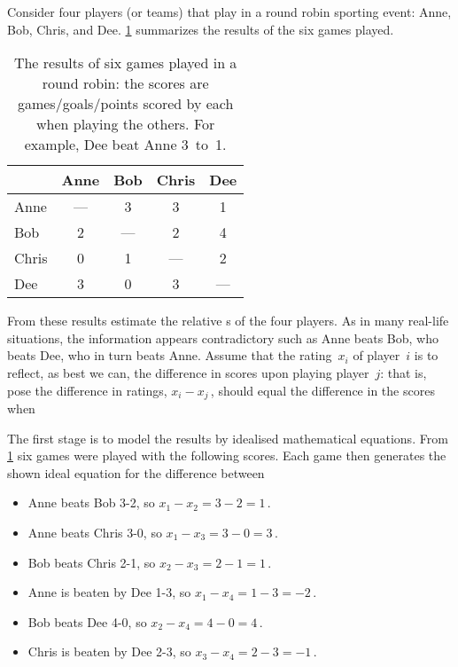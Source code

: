 \begin{example} \label{eg:roundrobin1}
Consider four players (or teams) that play in a round robin sporting event: Anne, Bob, Chris, and Dee.
\cref{tbl:roundrobin1} summarizes the results of the six games played.
\begin{table}
\caption{The results of six games played in a round robin: the scores are games\slash goals\slash points scored by each when playing the others.  For example, Dee beat Anne 3~to~1.}
\label{tbl:roundrobin1}
\begin{center}
\begin{tabular}{l|cccc} \hline
&Anne& Bob& Chris& Dee\\ \hline
Anne & --- & 3 & 3 & 1 \\
Bob & 2 & --- & 2 & 4 \\
Chris & 0 & 1 & --- & 2 \\
Dee & 3 & 0 & 3 & --- \\ \hline
\end{tabular}
\end{center}
\end{table}%
From these results estimate the relative s of the four players.
As in many real-life situations, the information appears contradictory such as Anne beats Bob, who beats Dee, who in turn beats Anne.
Assume that the rating~\(x_i\) of player~\(i\) is to reflect, as best we can, the difference in scores upon playing player~\(j\):  that is, pose the difference in ratings, \(x_i-x_j\)\,, should equal the difference in the scores when 
\begin{solution} 
The first stage is to model the results by idealised mathematical equations.
From \cref{tbl:roundrobin1} six games were played with the following scores.  
Each game then generates the shown ideal equation for the difference between 
\begin{itemize}
\item Anne beats Bob 3-2, so \(x_1-x_2=3-2=1\)\,.
\item Anne beats Chris 3-0, so \(x_1-x_3=3-0=3\)\,.
\item Bob beats Chris 2-1, so \(x_2-x_3=2-1=1\)\,.
\item Anne is beaten by Dee 1-3, so \(x_1-x_4=1-3=-2\)\,.
\item Bob beats Dee 4-0, so \(x_2-x_4=4-0=4\)\,.
\item Chris is beaten by Dee 2-3, so \(x_3-x_4=2-3=-1\)\,.
\end{itemize}

\end{solution}
\end{example}
